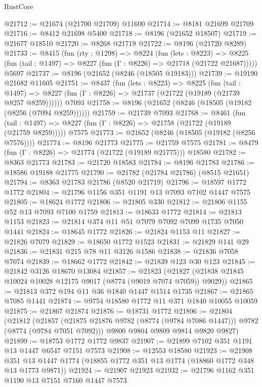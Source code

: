 \begin{lexlean}{RustCore}
\begin{coremodule}
@21712 := @21674 (@21700 @21709) @11600
@21714 := @8181 @21699 @21709
@21716 := @8412 @21698 @5400
@21718 := @8196 (@21652 @18507)
@21719 := @21677 @18510
@21720 := @8268 @21719
@21722 := @8196 (@21720 @8289)
@21733 := @8415
    (fun (rty : @1298) =>
    @8224
      (fun (lets : @8223) =>
      @8225 (fun (tail : @1497) => @8227 (fun (Γ : @8226) => @21718 (@21722 @21687)))))
    @5697
@21737 := @8196 (@21652 (@8246 (@18505 @19183)))
@21739 := @19190 @21682 @11605
@21751 := @8437
    (fun (lets : @8223) =>
    @8225
      (fun (tail : @1497) =>
      @8227 (fun (Γ : @8226) => @21737 (@21722 (@19189 (@21739 @8257 @8259))))))
    @7093
@21758 := @8196 (@21652 (@8246 (@18505 (@19182 (@8256 (@7094 @8259))))))
@21759 := @21739 @7093
@21768 := @8461
    (fun (tail : @1497) => @8227 (fun (Γ : @8226) => @21758 (@21722 (@19189 (@21759 @8259)))))
    @7575
@21773 := @21652 (@8246 (@18505 (@19182 (@8256 @7576))))
@21774 := @8196 @21773
@21775 := @21759 @7575
@21781 := @8479 (fun (Γ : @8226) => @21774 (@21722 (@19189 @21775))) @18580
@21782 := @8363 @21773
@21783 := @21720 @18583
@21784 := @8196 @21783
@21786 := @18586 @19188 @21775
@21790 := @21782 (@21784 @21786) (@8515 @21651)
@21794 := @8363 @21783 @21786 (@8520 @21719)
@21796 := @18597 @1772 @1772
@21804 := @21796 @1156 @351 @1191 @13 @7093 @7102 @1447 @7575
@21805 := @18624 @1772
@21806 := @21805 @330
@21812 := @21806 @1155 @52 @13 @7093 @7100 @1759
@21813 := @18633 @1772
@21814 := @21813 @1153
@21823 := @21814 @374 @11 @51 @7079 @7092 @7099 @1735 @7050 @1441
@21824 := @18645 @1772
@21826 := @21824 @1153 @11
@21827 := @21826 @7079
@21829 := @18650 @1772 @1523
@21831 := @21829 @141 @29
@21836 := @21831 @215 @78 @11 @3126 @1586
@21838 := @21836 @7058 @7074
@21839 := @18662 @1772
@21842 := @21839 @123 @30 @123
@21845 := @21842 @3126 @18670 @13084
@21857 := @21823
    (@21827 (@21838 @21845 @10024 @10028 @12175 @9017 (@8774 (@9019 @7074 @7059)) @9029))
@21865 := @21813 @372 @194 @11 @36 @1840 @1447 @1514 @1735
@21867 := @21865 @7085 @1441
@21874 := @9754 @18580 @1772 @11 @371 @1840 @10055 @10059
@21875 := @21867 @21874
@21876 := @18731 @1772
@21896 := @21804
    (@21812
      (@21857 (@21875 @21876 @9782 (@8774 (@9784 @7086 @1447))) @9782 (@8774 (@9784 @7051 @7092)))
      @9800
      @9804
      @9809
      @9814
      @9820
      @9827)
@21899 := @18753 @1772 @1772 @9837
@21907 := @21899 @7102 @351 @1191 @13 @1447 @6547 @7151 @7573
@21908 := @12553 @18580
@21923 := @21908
    @351
    @13
    @1447
    @1774
    (@18855 @1772 @351 @13 @1774 (@18860 @1772 @348 @13 @1773 @9871))
@21924 := @21907 @21923
@21932 := @21796 @1162 @351 @1190 @13 @7151 @7160 @1447 @7573

\end{coremodule}
\end{lexlean}

